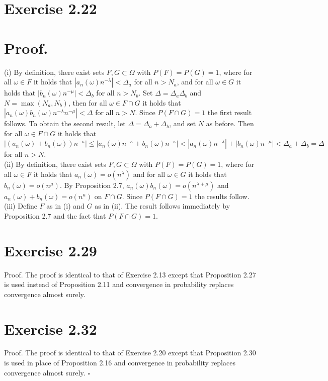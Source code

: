\documentclass[10pt]{article}
\begin{document}
\section*{Exercise 2.22}
\section*{Proof.}
(i) By definition, there exist sets $F, G \subset \Omega$ with $P(F)=P(G)=1$, where for all $\omega \in F$ it holds that $\left|a_{n}(\omega) n^{-\lambda}\right|<\Delta_{a}$ for all $n>N_{a}$, and for all $\omega \in G$ it holds that $\left|b_{n}(\omega) n^{-\mu}\right|<\Delta_{b}$ for all $n>N_{b}$. Set $\Delta=\Delta_{a} \Delta_{b}$ and $N=\max \left(N_{a}, N_{b}\right)$, then for all $\omega \in F \cap G$ it holds that $\left|a_{n}(\omega) b_{n}(\omega) n^{-\lambda} n^{-\mu}\right|<\Delta$ for all $n>N$. Since $P(F \cap G)=1$ the first result follows. To obtain the second result, let $\Delta=\Delta_{a}+\Delta_{b}$, and set $N$ as before. Then for all $\omega \in F \cap G$ it holds that $\left|\left(a_{n}(\omega)+b_{n}(\omega)\right) n^{-\kappa}\right| \leq \left|a_{n}(\omega) n^{-\kappa}+b_{n}(\omega) n^{-\kappa}\right|<\left|a_{n}(\omega) n^{-\lambda}\right|+\left|b_{n}(\omega) n^{-\mu}\right|<\Delta_{a}+\Delta_{b}=\Delta$ for all $n>N$.\\
(ii) By definition, there exist sets $F, G \subset \Omega$ with $P(F)=P(G)=1$, where for all $\omega \in F$ it holds that $a_{n}(\omega)=o\left(n^{\lambda}\right)$ and for all $\omega \in G$ it holds that $b_{n}(\omega)=o\left(n^{\mu}\right)$. By Proposition 2.7, $a_{n}(\omega) b_{n}(\omega)=o\left(n^{\lambda+\mu}\right)$ and $a_{n}(\omega)+b_{n}(\omega)=o\left(n^{\kappa}\right)$ on $F \cap G$. Since $P(F \cap G)=1$ the results follow.\\
(iii) Define $F$ as in (i) and $G$ as in (ii). The result follows immediately by Proposition 2.7 and the fact that $P(F \cap G)=1$.

\section*{Exercise 2.29}
Proof. The proof is identical to that of Exercise 2.13 except that Proposition 2.27 is used instead of Proposition 2.11 and convergence in probability replaces convergence almost surely.

\section*{Exercise 2.32}
Proof. The proof is identical to that of Exercise 2.20 except that Proposition 2.30 is used in place of Proposition 2.16 and convergence in probability replaces convergence almost surely. \(\square\)
\end{document}
